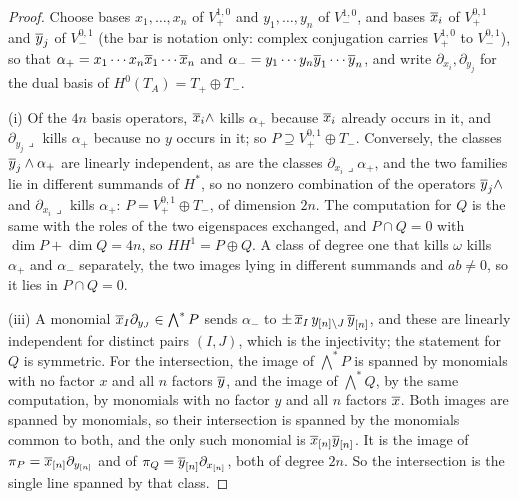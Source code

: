 \begin{proof}
Choose bases $x_{1},\dots,x_{n}$ of $V_{+}^{1,0}$ and $y_{1},\dots,y_{n}$ of
$V_{-}^{1,0}$, and bases $\overline{x}_{i}$ of $V_{+}^{0,1}$ and $\overline{y}_{j}$ of
$V_{-}^{0,1}$ (the bar is notation only: complex conjugation carries
$V_{+}^{1,0}$ to $V_{-}^{0,1}$), so that
$\alpha_{+}=x_{1}\cdots x_{n}\overline{x}_{1}\cdots\overline{x}_{n}$ and
$\alpha_{-}=y_{1}\cdots y_{n}\overline{y}_{1}\cdots\overline{y}_{n}$, and write
$\partial_{x_{i}},\partial_{y_{j}}$ for the dual basis of
$H^{0}(T_{A})=T_{+}\oplus T_{-}$.

(i) Of the $4n$ basis operators, $\overline{x}_{i}\wedge$ kills $\alpha_{+}$
because $\overline{x}_{i}$ already occurs in it, and $\partial_{y_{j}}\lrcorner$
kills $\alpha_{+}$ because no $y$ occurs in it; so $P\supseteq
V_{+}^{0,1}\oplus T_{-}$. Conversely, the classes
$\overline{y}_{j}\wedge\alpha_{+}$ are linearly independent, as are the classes
$\partial_{x_{i}}\lrcorner\alpha_{+}$, and the two families lie in different
summands of $H^{*}$, so no nonzero combination of the operators
$\overline{y}_{j}\wedge$ and $\partial_{x_{i}}\lrcorner$ kills $\alpha_{+}$:
$P=V_{+}^{0,1}\oplus T_{-}$, of dimension $2n$. The computation for $Q$ is the
same with the roles of the two eigenspaces exchanged, and
$P\cap Q=0$ with $\dim P+\dim Q=4n$, so $HH^{1}=P\oplus Q$. A class of degree
one that kills $\omega$ kills $\alpha_{+}$ and $\alpha_{-}$ separately, the
two images lying in different summands and $ab\ne0$, so it lies in
$P\cap Q=0$.

(iii) A monomial $\overline{x}_{I}\partial_{y_{J}}\in\bigwedge^{*}P$ sends
$\alpha_{-}$ to $\pm\,\overline{x}_{I}\,y_{[n]\setminus J}\,\overline{y}_{[n]}$, and
these are linearly independent for distinct pairs $(I,J)$, which is the
injectivity; the statement for $Q$ is symmetric. For the intersection, the
image of $\bigwedge^{*}P$ is spanned by monomials with no factor $x$ and all
$n$ factors $\overline{y}$, and the image of $\bigwedge^{*}Q$, by the same
computation, by monomials with no factor $y$ and all $n$ factors $\overline{x}$.
Both images are spanned by monomials, so their intersection is spanned by the
monomials common to both, and the only such monomial is
$\overline{x}_{[n]}\overline{y}_{[n]}$. It is the image of
$\pi_{P}=\overline{x}_{[n]}\partial_{y_{[n]}}$ and of
$\pi_{Q}=\overline{y}_{[n]}\partial_{x_{[n]}}$, both of degree $2n$. So the
intersection is the single line spanned by that class.


\end{proof}
